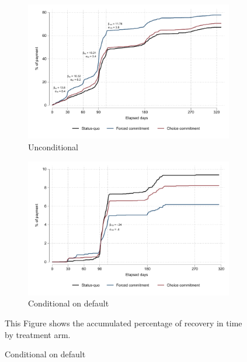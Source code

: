 \begin{figure}[H]
        \caption{\% of payment over time}
    \label{porc_payment_over_time}
    \begin{center}
   \begin{subfigure}{0.49\textwidth}
        \caption{Unconditional}
        \centering
        \includegraphics[width=\textwidth]{Figuras/cumulative_porc_pay_time.pdf}
    \end{subfigure} 
   \begin{subfigure}{0.49\textwidth}
        \caption{Conditional on default}
        \centering
        \includegraphics[width=\textwidth]{Figuras/cumulative_porc_pay_time_default.pdf}
    \end{subfigure}     
    \end{center}
     \scriptsize  This Figure shows the accumulated percentage of recovery in time by treatment arm. 
\end{figure}




